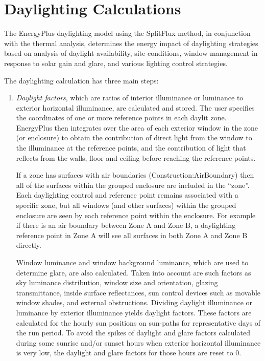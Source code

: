 \section{Daylighting Calculations}\label{daylighting-calculations}

The EnergyPlus daylighting model using the SplitFlux method, in conjunction with the thermal analysis,
determines the energy impact of daylighting strategies based on analysis of daylight availability,
site conditions, window management in response to solar gain and glare, and various lighting control strategies.

The daylighting calculation has three main steps:
\begin{enumerate}
\def\labelenumi{(\arabic{enumi})}
\item
    \emph{Daylight factors}, which are ratios of interior illuminance or luminance to exterior horizontal illuminance, are calculated and stored.
    The user specifies the coordinates of one or more reference points in each daylit zone.
    EnergyPlus then integrates over the area of each exterior window in the zone (or enclosure) to obtain the contribution of direct light from the window to the illuminance at the reference points,
    and the contribution of light that reflects from the walls, floor and ceiling before reaching the reference points.

    If a zone has surfaces with air boundaries (Construction:AirBoundary)
    then all of the surfaces within the grouped enclosure are included in the ``zone''. Each daylighting control and reference point
    remains associated with a specific zone, but all windows (and other surfaces) within the grouped enclosure are seen by each reference point within the enclosure. For example if there is an air
    boundary between Zone A and Zone B, a daylighting reference point in Zone A will see all surfaces in both Zone A and Zone B directly.

    Window luminance and window background luminance, which are used to determine glare, are also calculated.
    Taken into account are such factors as sky luminance distribution, window size and orientation, glazing transmittance, inside surface reflectances,
    sun control devices such as movable window shades, and external obstructions. Dividing daylight illuminance or luminance by exterior illuminance yields daylight factors.
    These factors are calculated for the hourly sun positions on sun-paths for representative days of the run period.
    To avoid the spikes of daylight and glare factors calculated during some sunrise and/or sunset hours when exterior horizontal illuminance is very low,
    the daylight and glare factors for those hours are reset to 0.


\end{enumerate}

